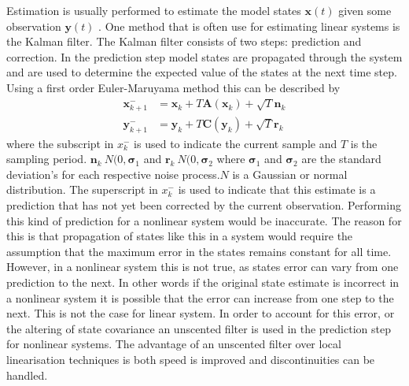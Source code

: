 Estimation is usually performed to estimate the model states $\mathbf{x}(t)$ given some observation $\mathbf{y}(t)$ . One method that is often use for estimating linear systems is the Kalman filter. The Kalman filter consists of two steps: prediction and correction. In the prediction step model states are propagated through the system and are used to determine the expected value of the states at the next time step. Using a first order Euler-Maruyama method this can be described by \begin{align}
\mathbf{x}_{k+1}^{-} &= \mathbf{x}_{k} + T\mathbf{A}(\mathbf{x}_{k}) +\sqrt{T}\mathbf{n}_{k}\\
\label{eqn: YProp}
\mathbf{y}_{k+1}^{-}  &= \mathbf{y}_{k} + T\mathbf{C}(\mathbf{y}_{k}) +\sqrt{T}\mathbf{r}_{k}
\end{align} where the subscript in $x_{k}^{-}$ is used to indicate the current sample and $T$ is the sampling period. $\mathbf{n}_{k}~N(0,\mathbf{\sigma}_{1}$ and $\mathbf{r}_{k}~N(0,\mathbf{\sigma}_{2}$ where $\mathbf{\sigma}_{1}$ and $\mathbf{\sigma}_2$ are the standard deviation's for each respective noise process.$N$ is a Gaussian or normal distribution. The superscript in $x_{k}^{-}$ is used to indicate that this estimate is a prediction that has not yet been corrected by the current observation. Performing this kind of prediction for a nonlinear system would be inaccurate. The reason for this is that propagation of states like this in a system would require the assumption that the maximum error in the states remains constant for all time. However, in a nonlinear system this is not true, as states error can vary from one prediction to the next. In other words if the original state estimate is incorrect in a nonlinear system it is possible that the error can increase from one step to the next. This is not the case for linear system. In order to account for this error, or the altering of state covariance an unscented filter is used in the prediction step for nonlinear systems. The advantage of an unscented filter over local linearisation techniques is both speed is improved and discontinuities can be handled. 

